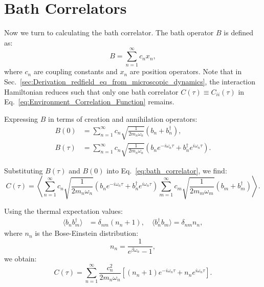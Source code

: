 \section{Bath Correlators}
\label{sec:bath_corr_trans_rates}

Now we turn to calculating the bath correlator.
The bath operator \( B \) is defined as:
\begin{equation} \label{eq:bath_operator}
	B = \sum_{n=1}^{\infty} c_n x_n,
\end{equation}
where \( c_n \) are coupling constants and \( x_n \) are position operators. Note that in Sec.~\ref{sec:Derivation_redfield_eq_from_microscopic_dynamics}, the interaction Hamiltonian reduces such that only one bath correlator \( C(\tau) \equiv C_{ii}(\tau) \) in Eq.~\eqref{eq:Environment_Correlation_Function} remains.

Expressing \( B \) in terms of creation and annihilation operators:
\begin{align}
	B(0)    & = \sum_{n=1}^{\infty} c_n \sqrt{\frac{1}{2 m_n \omega_n}} (b_n + b_n^\dagger), \label{eq:bath_operator_t0}                                                        \\
	B(\tau) & = \sum_{n=1}^{\infty} c_n \sqrt{\frac{1}{2 m_n \omega_n}} \left( b_n e^{-i \omega_n \tau} + b_n^\dagger e^{i \omega_n \tau} \right). \label{eq:bath_operator_tau}
\end{align}

Substituting \( B(\tau) \) and \( B(0) \) into Eq.~\eqref{eq:bath_correlator}, we find:
\begin{equation} \label{eq:correlator_substitution}
	C(\tau) = \left\langle \sum_{n=1}^{\infty} c_n \sqrt{\frac{1}{2 m_n \omega_n}} (b_n e^{-i \omega_n \tau} + b_n^\dagger e^{i \omega_n \tau}) \sum_{m=1}^{\infty} c_m \sqrt{\frac{1}{2 m_m \omega_m}} (b_m + b_m^\dagger) \right\rangle.
\end{equation}

Using the thermal expectation values:
\begin{align} \label{eq:thermal_expectations}
	\langle b_n b_m^\dagger \rangle & = \delta_{nm} (n_n + 1), \quad \langle b_n^\dagger b_m \rangle = \delta_{nm} n_n,
\end{align}
where \( n_n \) is the Bose-Einstein distribution:
\begin{equation} \label{eq:bose_einstein_distribution}
	n_n = \frac{1}{e^{\beta \omega_n} - 1},
\end{equation}
we obtain:
\begin{equation} \label{eq:correlator_result}
	C(\tau) = \sum_{n=1}^{\infty} \frac{c_n^2}{2 m_n \omega_n} \left[ (n_n + 1) e^{-i \omega_n \tau} + n_n e^{i \omega_n \tau} \right].
\end{equation}

